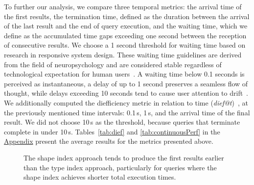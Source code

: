  

To further our analysis, we compare three temporal metrics: the arrival time of the first results, the termination time, defined as the duration between the arrival of the last result and the end of query execution, and the waiting time, which we define as the accumulated time gaps exceeding one second between the reception of consecutive results.
We choose a 1 second threshold for waiting time based on research in responsive system design.
These waiting time guidelines are derived from the field of neuropsychology and are considered stable regardless of technological expectation for human users~\cite{uxtigersNeedSpeed, Nielsen1993}.
A waiting time below 0.1 seconds is perceived as instantaneous, a delay of up to 1 second preserves a seamless flow of thought, while delays exceeding 10 seconds tend to cause user attention to drift~\cite{Nielsen1993}.
We additionally computed the diefficiency metric in relation to time (\textit{dief@t})~\cite{Acosta2017}, at the previously mentioned time intervals: 0.1\,s, 1\,s, and the arrival time of the final result.
We did not choose 10\,s as the threshold, because queries that terminate complete in under 10\,s.
Tables~\ref{tab:dief} and \ref{tab:continuousPerf} in the \hyperref[sec:appendix]{Appendix} present the average results for the metrics presented above.

\begin{figure}
    \centering
    
    \caption{The shape index approach tends to produce the first results earlier than the type index approach, particularly for queries where the shape index achieves shorter total execution times.}
    \label{fig:first_res}
\end{figure}

